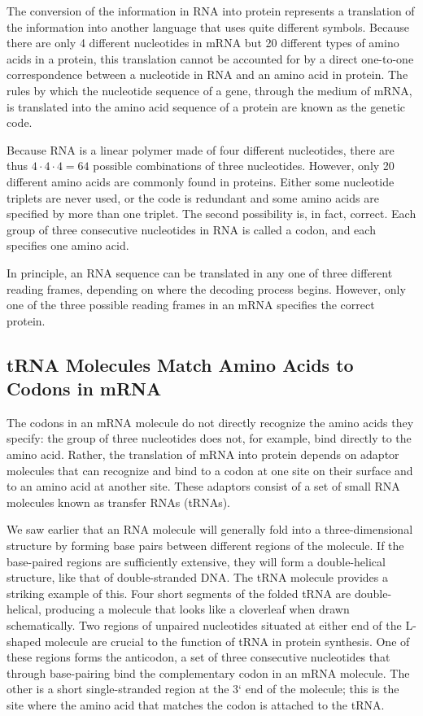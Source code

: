 The conversion of the information in RNA into protein represents a translation
of the information into another language that uses
quite different symbols. Because there are only 4 different nucleotides in
mRNA but 20 different types of amino acids in a protein, this translation
cannot be accounted for by a direct one-to-one correspondence between
a nucleotide in RNA and an amino acid in protein. The rules by which the
nucleotide sequence of a gene, through the medium of mRNA, is translated
into the amino acid sequence of a protein are known as the genetic
code.

Because RNA is a linear polymer made of four different
nucleotides, there are thus $4 \cdot 4 \cdot 4 = 64$ possible combinations of
three nucleotides. However, only 20 different amino acids are commonly
found in proteins. Either some nucleotide triplets are never used, or
the code is redundant and some amino acids are
specified by more than one triplet. The second possibility is, in fact, correct.
Each group of three consecutive nucleotides in RNA is called a codon,
and each specifies one amino acid.

In principle, an RNA sequence can be translated in any one of three different
reading frames, depending on where the decoding process begins. However,
only one of the three possible reading frames in an mRNA specifies the correct protein.

\subsection{tRNA Molecules Match Amino Acids to Codons in mRNA}

The codons in an mRNA molecule do not directly recognize the amino
acids they specify: the group of three nucleotides does not, for example,
bind directly to the amino acid. Rather, the translation of mRNA into
protein depends on adaptor molecules that can recognize and bind to a
codon at one site on their surface and to an amino acid at another site.
These adaptors consist of a set of small RNA molecules known as transfer RNAs (tRNAs).

We saw earlier that an RNA molecule will generally fold into a three-dimensional
structure by forming base pairs between different regions
of the molecule. If the base-paired regions are sufficiently extensive, they
will form a double-helical structure, like that of double-stranded DNA.
The tRNA molecule provides a striking example of this. Four short segments
of the folded tRNA are double-helical, producing a molecule that
looks like a cloverleaf when drawn schematically.
Two regions of unpaired nucleotides situated at either end of the L-shaped
molecule are crucial to the function of tRNA in protein synthesis. One
of these regions forms the anticodon, a set of three consecutive nucleotides
that through base-pairing bind the complementary codon in an
mRNA molecule. The other is a short single-stranded region at the 3` end
of the molecule; this is the site where the amino acid that matches the
codon is attached to the tRNA.

